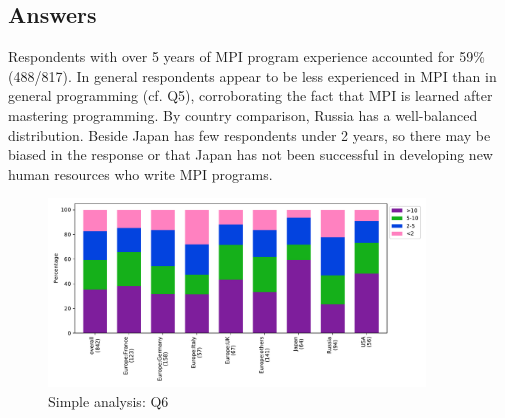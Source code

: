 
\subsection{Answers}


Respondents with over 5 years of MPI program experience 
accounted for 59\% (488/817). In general respondents appear to be less
experienced in MPI than in general programming (cf. Q5), corroborating the fact
that MPI is learned after mastering programming. By country comparison, 
Russia has a well-balanced distribution. Beside Japan has 
few respondents under 2 years, so there may be biased in the 
response or that Japan has not been successful in 
developing new human resources who write MPI programs.


\begin{figure}[htb]
\begin{center}
\includegraphics[width=10cm]{../pdfs/Q6.pdf}
\caption{Simple analysis: Q6}
\label{fig:Q6}
\end{center}
\end{figure}
